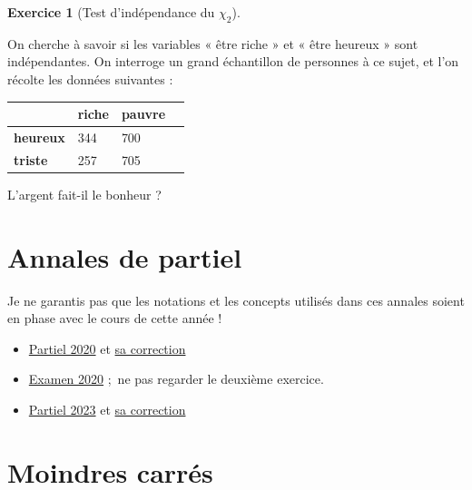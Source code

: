 \documentclass[
  10,
  letterpaper,
  DIV=11,
  numbers=noendperiod]{scrreport}
\theoremstyle{plain}
\theoremstyle{definition}
\newtheorem{exercise}{Exercice}[chapter]
\theoremstyle{plain}
\theoremstyle{definition}
\theoremstyle{definition}
\theoremstyle{plain}
\theoremstyle{remark}
\begin{document}
\begin{exercise}[Test d'indépendance du
\(\chi_2\)]\protect\hypertarget{exr-testind}{}\label{exr-testind}

On cherche à savoir si les variables « être riche » et « être heureux »
sont indépendantes. On interroge un grand échantillon de personnes à ce
sujet, et l'on récolte les données suivantes :

\begin{longtable}[]{@{}llll@{}}
\toprule\noalign{}
& riche & pauvre & \\
\midrule\noalign{}
\endhead
\bottomrule\noalign{}
\endlastfoot
\textbf{heureux} & 344 & 700 & \\
\textbf{triste} & 257 & 705 & \\
\end{longtable}

L'argent fait-il le bonheur ?

\end{exercise}


\hypertarget{annales-de-partiel}{%
\chapter*{Annales de partiel}\label{annales-de-partiel}}


Je ne garantis pas que les notations et les concepts utilisés dans ces
annales soient en phase avec le cours de cette année !

\begin{itemize}
\item
  \href{/pdfs/CC1.pdf}{Partiel 2020} et \href{/pdfs/Corrige_CC1.pdf}{sa
  correction}
\item
  \href{/pdfs/ExoExam.pdf}{Examen 2020} ;~ne pas regarder le deuxième
  exercice.
\item
  \href{/pdfs/Partiel2023.pdf}{Partiel 2023} et
  \href{/pdfs/Partiel2023Corrige.pdf}{sa correction}
\end{itemize}


\hypertarget{moindres-carruxe9s}{%
\chapter{Moindres carrés}\label{moindres-carruxe9s}}
\end{document}
